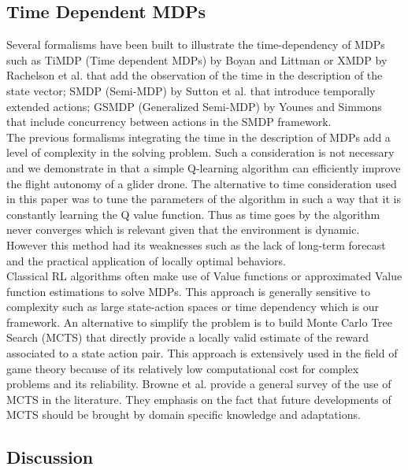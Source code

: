 \documentclass[a4paper]{article}
\begin{document}
\subsection{Time Dependent MDPs}
Several formalisms have been built to illustrate the time-dependency of MDPs such as TiMDP (Time dependent MDPs) by Boyan and Littman \cite{boyan_littman_2000} or XMDP by  Rachelson et al. \cite{rachelson_et_al_2008} that add the observation of the time in the description of the state vector; SMDP (Semi-MDP) by Sutton et al. \cite{sutton_et_al_1999} that introduce temporally extended actions; GSMDP (Generalized Semi-MDP) by Younes and Simmons \cite{younes_simmons_2004} that include concurrency between actions in the SMDP framework.
\\

\noindent The previous formalisms integrating the time in the description of MDPs add a level of complexity in the solving problem. Such a consideration is not necessary and we demonstrate in \cite{lecarpentier_et_al_2016} that a simple Q-learning algorithm \cite{watkins_1989} can efficiently improve the flight autonomy of a glider drone. The alternative to time consideration used in this paper was to tune the parameters of the algorithm in such a way that it is constantly learning the Q value function. Thus as time goes by the algorithm never converges which is relevant given that the environment is dynamic. However this method had its weaknesses such as the lack of long-term forecast and the practical application of locally optimal behaviors.
\\

\noindent Classical RL algorithms often make use of Value functions or approximated Value function estimations to solve MDPs. This approach is generally sensitive to complexity such as large state-action spaces or time dependency which is our framework. An alternative to simplify the problem is to build Monte Carlo Tree Search (MCTS) that directly provide a locally valid estimate of the reward associated to a state action pair. This approach is extensively used in the field of game theory because of its relatively low computational cost for complex problems and its reliability. Browne et al. \cite{browne2012survey} provide a general survey of the use of MCTS in the literature. They emphasis on the fact that future developments of MCTS should be brought by domain specific knowledge and adaptations.

\subsection{Discussion}
\end{document}
